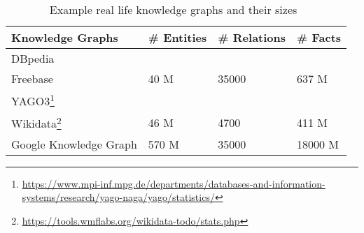 \begin{table}[t]
\centering


\begin{tabular}{@{}llll@{}}
\toprule
Knowledge Graphs       & \# Entities & \# Relations & \# Facts \\ \midrule
DBpedia                &             &              &          \\
Freebase			   &     40 M    &      35000   &    637 M \\
YAGO3\footnote{\url{https://www.mpi-inf.mpg.de/departments/databases-and-information-systems/research/yago-naga/yago/statistics/}}                  &             &              &          \\
Wikidata\footnote{\url{https://tools.wmflabs.org/wikidata-todo/stats.php}}       &      46 M   &       4700   &   411 M  \\
Google Knowledge Graph &      570 M  &       35000  &   18000 M\\ \bottomrule
\end{tabular}
\caption{Example real life knowledge graphs and their sizes~\cite{Nickel2015ARO}}
\label{tab:kgs}

\end{table}